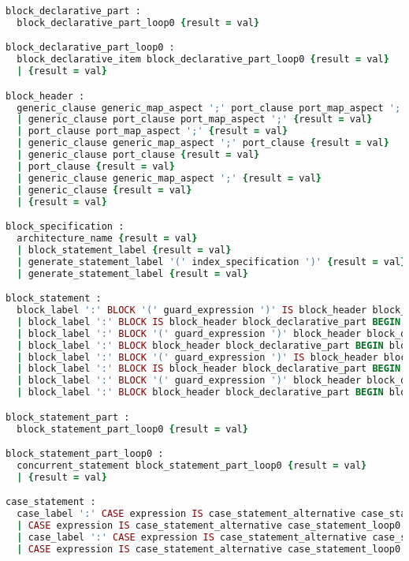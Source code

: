 \begin{lstlisting}[language=Ruby, style=rubystyle]
block_declarative_part :
  block_declarative_part_loop0 {result = val}

block_declarative_part_loop0 :
  block_declarative_item block_declarative_part_loop0 {result = val}
  | {result = val}

block_header :
  generic_clause generic_map_aspect ';' port_clause port_map_aspect ';' {result = val}
  | generic_clause port_clause port_map_aspect ';' {result = val}
  | port_clause port_map_aspect ';' {result = val}
  | generic_clause generic_map_aspect ';' port_clause {result = val}
  | generic_clause port_clause {result = val}
  | port_clause {result = val}
  | generic_clause generic_map_aspect ';' {result = val}
  | generic_clause {result = val}
  | {result = val}

block_specification :
  architecture_name {result = val}
  | block_statement_label {result = val}
  | generate_statement_label '(' index_specification ')' {result = val}
  | generate_statement_label {result = val}

block_statement :
  block_label ':' BLOCK '(' guard_expression ')' IS block_header block_declarative_part BEGIN block_statement_part END BLOCK block_label ';' {result = val}
  | block_label ':' BLOCK IS block_header block_declarative_part BEGIN block_statement_part END BLOCK block_label ';' {result = val}
  | block_label ':' BLOCK '(' guard_expression ')' block_header block_declarative_part BEGIN block_statement_part END BLOCK block_label ';' {result = val}
  | block_label ':' BLOCK block_header block_declarative_part BEGIN block_statement_part END BLOCK block_label ';' {result = val}
  | block_label ':' BLOCK '(' guard_expression ')' IS block_header block_declarative_part BEGIN block_statement_part END BLOCK ';' {result = val}
  | block_label ':' BLOCK IS block_header block_declarative_part BEGIN block_statement_part END BLOCK ';' {result = val}
  | block_label ':' BLOCK '(' guard_expression ')' block_header block_declarative_part BEGIN block_statement_part END BLOCK ';' {result = val}
  | block_label ':' BLOCK block_header block_declarative_part BEGIN block_statement_part END BLOCK ';' {result = val}

block_statement_part :
  block_statement_part_loop0 {result = val}

block_statement_part_loop0 :
  concurrent_statement block_statement_part_loop0 {result = val}
  | {result = val}

case_statement :
  case_label ':' CASE expression IS case_statement_alternative case_statement_loop0 END CASE case_label ';' {result = val;}
  | CASE expression IS case_statement_alternative case_statement_loop0 END CASE case_label ';' {result = val;}
  | case_label ':' CASE expression IS case_statement_alternative case_statement_loop0 END CASE ';' {result = val;}
  | CASE expression IS case_statement_alternative case_statement_loop0 END CASE ';' {result = val.join(' ');}


\end{lstlisting}
